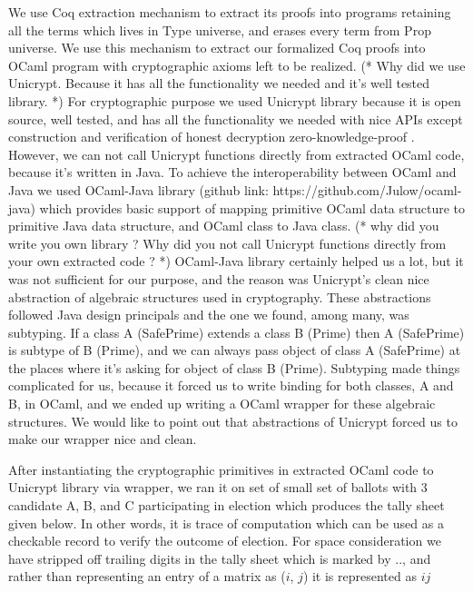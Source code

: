 \documentclass{llncs}
\begin{document}
We use Coq extraction mechanism\cite{Letouzey:2003:NEC}  to extract its proofs into programs retaining all the terms which lives in Type universe, 
and erases every term  from Prop universe. We use this mechanism to 
extract our formalized Coq proofs into OCaml\cite{Leroy:2013:ORM} program 
with cryptographic axioms left to be realized. (* Why did we use 
Unicrypt. Because it has all the functionality we needed and it's well 
tested library. *) For cryptographic purpose we used Unicrypt library
because it is open source, well tested, and has all the functionality 
we needed with nice APIs except construction and verification of 
honest decryption zero-knowledge-proof .
However, we can not call Unicrypt functions directly from extracted OCaml 
code, because it's written in Java. To achieve the interoperability 
between OCaml and Java we used OCaml-Java library 
(github link: https://github.com/Julow/ocaml-java) which provides
 basic support of mapping  primitive OCaml data structure to
 primitive Java  data structure, and OCaml class to Java class. 
 (* why did you write you own library ? Why did you not call 
   Unicrypt functions directly from your own extracted code ? *)
 OCaml-Java library certainly helped us a lot, but it was not sufficient for
 our purpose, and the reason was Unicrypt's clean nice abstraction of 
 algebraic structures used in cryptography. These abstractions followed 
 Java design principals and the one we found, among many, was subtyping.
 If a class A (SafePrime) extends a class B (Prime) then 
 A (SafePrime) is subtype of B (Prime), 
 and we can always pass object of class A (SafePrime) at 
 the places where it's asking for object of class B (Prime). 
 Subtyping made things complicated for us, because it forced us to 
 write binding for both classes, A and B, in OCaml, and we ended up writing a
 OCaml wrapper for these algebraic structures. We would like to point out
 that abstractions of Unicrypt forced us to make our wrapper 
 nice and clean.   
 
 After instantiating the  
 cryptographic primitives in extracted OCaml code 
 to Unicrypt library via wrapper, we ran it on set of
 small set of ballots with 3 candidate A, B, and C participating in election
 which produces the tally sheet given below. In other words, 
 it is trace of computation which can be used as a checkable record to verify
 the outcome of election. For space consideration we have stripped off 
 trailing digits in the tally sheet which is marked by $..$, and rather 
 than representing an entry of a matrix as ($i$, $j$) it is represented as 
 $ij$
 
\end{document}
